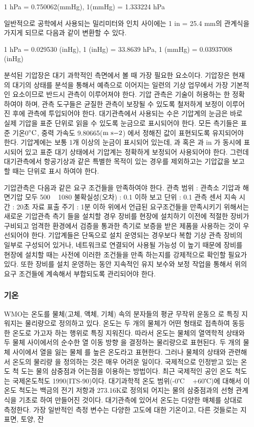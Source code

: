 \begin{itemize}
{1 hPa = 0.750062(mmHg), 1(mmHg) = 1.333224 hPa

일반적으로 공학에서 사용되는 밀리미터와 인치 사이에는 1 in = 25.4 mm의 관계식을 가지게 되므로 다음과 같이 변환할 수 있다.

1 hPa = 0.029530 (inHg), 1 (inHg) = 33.8639 hPa, 1 (mmHg) = 0.03937008 (inHg)

분석된 기압장은 대기 과학적인 측면에서 볼 때 가장 필요한 요소이다. 기압장은 현재의 대기의 상태를 분석을 통해서 예측으로 이어지는 일련의 기상 업무에서 가장 기본적인 요소이므로 반드시 관측이 이루어져야 한다. 기압 관측은 기술이 허용하는 한 정확하여야 하며, 관측 도구들은 균질한 관측이 보장될 수 있도록 철저하게 보정이 이루어진 후에 관측에 투입되어야 한다.
대기관측에서 사용되는 수은 기압계의 눈금은 바로 실제 기압을 표준 단위로 읽을 수 있도록 눈금으로 표시되어야 한다. 모든 측기들은 표준 기온0$\rm ^{\circ}C$, 중력 가속도 9.80665($\rm m~s{-2}$) 에서 정해진 값이 표현되도록 유지되어야 한다. 기압계에는 보통 1개 이상의 눈금이 표시되어 있는데, 과 혹은
과 in 가 동시에 표시되어 있고 표준 대기 상태에서 기압계는 정확하게 보정되어 사용되어야 한다. 그런데 대기관측에서 항공기상과 같은 특별한 목적이 있는 경우를 제외하고는 기압값을 보고할 때는 단위로 표시
하여야 한다.

기압관측은 다음과 같은 요구 조건들을 만족하여야 한다.
관측 범위 : 관측소 기압과 해면기압 모두 500 ~ 1080
불확실성(오차) : 0.1 이하
보고 단위 : 0.1
관측 센서 지속 시간 : 20초
자료 표출 주기 : 1분 이하
위에서 언급된 요구조건들을 만족시키기 위해서는 새로운 기압관측 측기
들을 설치할 경우 장비를 현장에 설치하기 이전에 적절한 장비가 구비되고
엄격한 환경에서 검증을 통과한 측기로 보증을 받은 제품을 사용하는 것이
우선되어야 한다. 기압계들은 단독으로 설치 운영되는 경우보다 복합 기상
관측 장비의 일부로 구성되어 있거나, 네트워크로 연결되어 사용될 가능성
이 높기 때문에 장비를 현장에 설치할 때는 사전에 이러한 조건들을 만족
하는지를 강제적으로 확인할 필요가 있다. 또한 장비를 설치 운영하는 동안
지속적인 유지 보수와 보정 작업을 통해서 위의 요구 조건들에 계속해서
부합되도록 관리되어야 한다.

\subsubsection{기온}
WMO는 온도를 물체(고체, 액체, 기체) 속의 분자들의 평균 무작위 운동으
로 특징 지워지는 물리량으로 정의하고 있다. 온도는 두 개의 물체가 어떤
형태로 접촉하여 동등한 온도로 가고자 하는 행위로 특징 지워진다. 따라서
온도는 물체의 열역학적 상태와 두 물체 사이에서의 순수한 열 이동 방향
을 결정하는 물리량으로 표현된다. 두 개의 물체 사이에서 열을 잃는 물체
를 높은 온도라고 표현한다. 그러나 물체의 상태와 관련해서 온도의 물리량
을 정의하는 것은 매우 어려운 일이다. 국제적으로 인정받고 있는 온도 척
도는 물의 삼중점과 어는점을 이용하는 방법이다. 최근 국제적인 공인 온도
척도는 국제온도척도 1990(ITS-90)이다. 대기과학적 온도 범위(-0℃ ~
+60℃)에 대해서 이 온도 척도는 백금의 전기 저항과 273.16K로 정의되
어지는 물의 삼중점과의 선형 관계식을 기초로 하여 만들어진 것이다.
대기관측에 있어서 온도는 다양한 매체를 상대로 측정한다. 가장 일반적인
측정 변수는 다양한 고도에 대한 기온이고, 다른 것들로는 지표면, 토양, 잔

}
\end{itemize}
